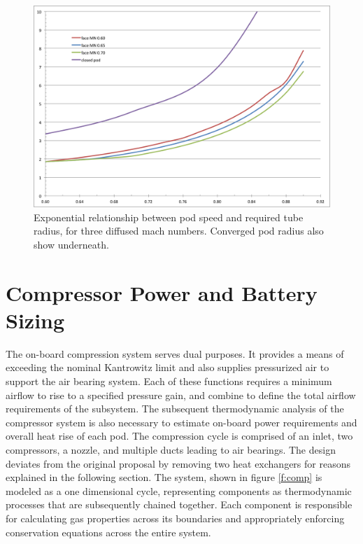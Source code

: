 \documentclass[heading.tex]{subfiles}
\begin{document}
\begin{figure}[H]
\centering
\includegraphics[width=\textwidth]{images/mach_vs_rad4.png}
\caption[Tube and Pod Radius vs Mach]{Exponential relationship between pod speed and required tube radius, for three diffused mach numbers.
Converged pod radius also show underneath. }
\label{f:machRAD}
\end{figure}


\section{Compressor Power and Battery Sizing}
\label{sec:compressor-and-battery}

The on-board compression system serves dual purposes.
It provides a means of exceeding the nominal Kantrowitz limit and also supplies pressurized air to support the air bearing system.
Each of these functions requires a minimum airflow to rise to a specified pressure gain,
and combine to define the total airflow requirements of the subsystem.
The subsequent thermodynamic analysis of the compressor system is also necessary to
estimate on-board power requirements and overall heat rise of each pod.
The compression cycle is comprised of an inlet, two compressors, a nozzle, and multiple ducts leading to air bearings.
The design deviates from the original proposal by removing two heat exchangers for reasons explained in the following section.
The system, shown in figure \ref{f:comp} is modeled as a one dimensional cycle,
representing components as thermodynamic processes that are subsequently chained together.
Each component is responsible for calculating gas properties across its boundaries
and appropriately enforcing conservation equations across the entire system.
\end{document}
